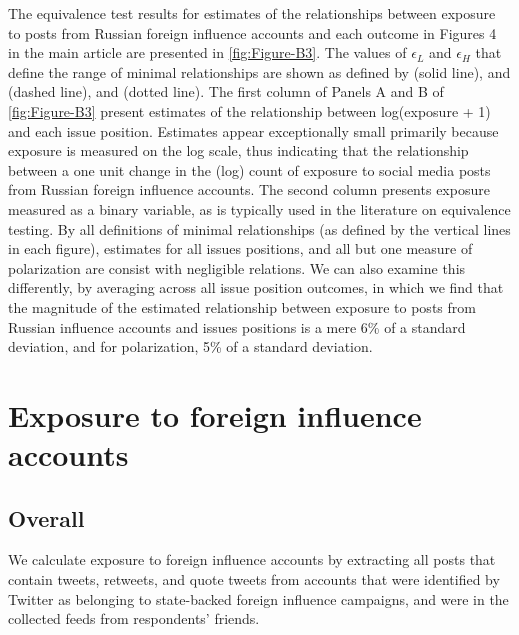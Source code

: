 \documentclass[
  12pt,
]{article}
\begin{document}
The equivalence test results for estimates of the relationships between exposure to posts from Russian foreign influence accounts and each outcome in Figures 4 in the main article are presented in \autoref{fig:Figure-B3}. The values of \(\epsilon_L\) and \(\epsilon_H\) that define the range of minimal relationships are shown as defined by \citet{Hartman2018} (solid line), \citet{Ho2007} and \citet{Imbens2015} (dashed line), and \citet{Cohen1969} (dotted line). The first column of Panels A and B of \autoref{fig:Figure-B3} present estimates of the relationship between log(exposure + 1) and each issue position. Estimates appear exceptionally small primarily because exposure is measured on the log scale, thus indicating that the relationship between a one unit change in the (log) count of exposure to social media posts from Russian foreign influence accounts. The second column presents exposure measured as a binary variable, as is typically used in the literature on equivalence testing. By all definitions of minimal relationships (as defined by the vertical lines in each figure), estimates for all issues positions, and all but one measure of polarization are consist with negligible relations. We can also examine this differently, by averaging across all issue position outcomes, in which we find that the magnitude of the estimated relationship between exposure to posts from Russian influence accounts and issues positions is a mere 6\% of a standard deviation, and for polarization, 5\% of a standard deviation.

\clearpage

\hypertarget{exposure-to-foreign-influence-accounts}{%
\section{Exposure to foreign influence accounts}\label{exposure-to-foreign-influence-accounts}}

\hypertarget{overall}{%
\subsection{\texorpdfstring{Overall\label{section:exposure}}{Overall}}\label{overall}}

We calculate exposure to foreign influence accounts by extracting all posts that contain tweets, retweets, and quote tweets from accounts that were identified by Twitter as belonging to state-backed foreign influence campaigns, and were in the collected feeds from respondents' friends.
\end{document}
